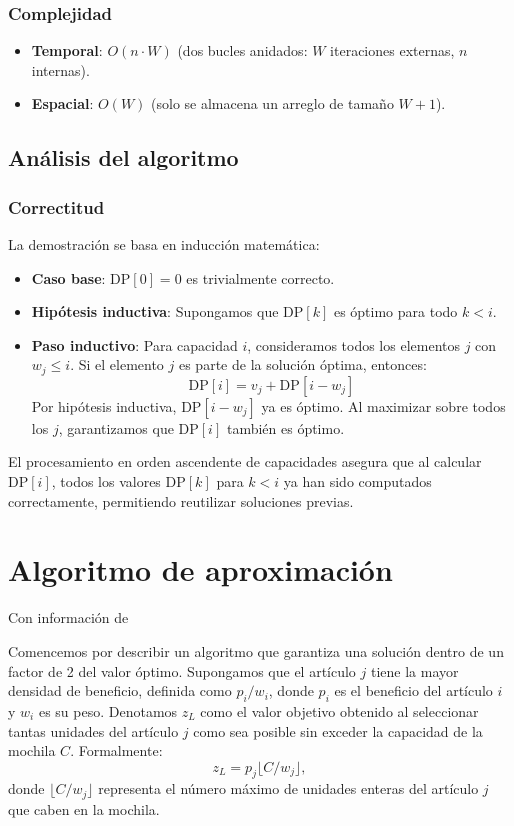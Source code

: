\documentclass{report}
\begin{document}
\subsubsection*{Complejidad}
\begin{itemize}
    \item \textbf{Temporal}: $O(n \cdot W)$ (dos bucles anidados: $W$ iteraciones externas, $n$ internas).
    \item \textbf{Espacial}: $O(W)$ (solo se almacena un arreglo de tamaño $W+1$).
\end{itemize}

\subsection{Análisis del algoritmo}
\subsubsection*{Correctitud}
La demostración se basa en inducción matemática:

\begin{itemize}
    \item \textbf{Caso base}: $\text{DP}[0] = 0$ es trivialmente correcto.
    
    \item \textbf{Hipótesis inductiva}: Supongamos que $\text{DP}[k]$ es óptimo para todo $k < i$.
    
    \item \textbf{Paso inductivo}: Para capacidad $i$, consideramos todos los elementos $j$ con $w_j \leq i$. Si el elemento $j$ es parte de la solución óptima, entonces:
    \[
    \text{DP}[i] = v_j + \text{DP}[i - w_j]
    \]
    Por hipótesis inductiva, $\text{DP}[i - w_j]$ ya es óptimo. Al maximizar sobre todos los $j$, garantizamos que $\text{DP}[i]$ también es óptimo.
\end{itemize}

El procesamiento en orden ascendente de capacidades asegura que al calcular $\text{DP}[i]$, todos los valores $\text{DP}[k]$ para $k < i$ ya han sido computados correctamente, permitiendo reutilizar soluciones previas.


\section{Algoritmo de aproximación}
Con información de \cite{Rhee2016}

Comencemos por describir un algoritmo que garantiza una solución dentro de un factor de 2 del valor óptimo. Supongamos que el artículo $ j $ tiene la mayor densidad de beneficio, definida como $ p_i / w_i $, donde $ p_i $ es el beneficio del artículo $ i $ y $ w_i $ es su peso. Denotamos $ z_L $ como el valor objetivo obtenido al seleccionar tantas unidades del artículo $ j $ como sea posible sin exceder la capacidad de la mochila $ C $. Formalmente:
\[
z_L = p_j \lfloor C / w_j \rfloor,
\]
donde $ \lfloor C / w_j \rfloor $ representa el número máximo de unidades enteras del artículo $ j $ que caben en la mochila.
\end{document}
